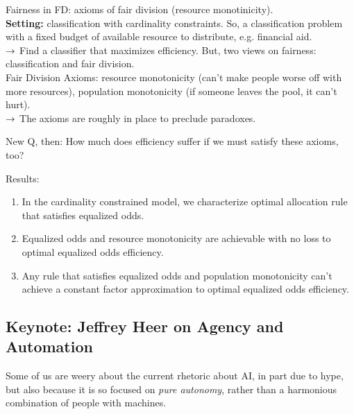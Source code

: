 Fairness in FD: axioms of fair division (resource monotinicity). \\

{\bf Setting:} classification with cardinality constraints. So, a classification problem with a fixed budget of available resource to distribute, e.g. financial aid. \\

$\rightarrow$ Find a classifier that maximizes efficiency. But, two views on fairness: classification and fair division.\\

Fair Division Axioms: resource monotonicity (can't make people worse off with more resources), population monotonicity (if someone leaves the pool, it can't hurt).\\ 

$\rightarrow$ The axioms are roughly in place to preclude paradoxes.

New Q, then: How much does efficiency suffer if we must satisfy these axioms, too? \\


Results:
\begin{enumerate}
    \item In the cardinality constrained model, we characterize optimal allocation rule that satisfies equalized odds.
    \item Equalized odds and resource monotonicity are achievable with no loss to optimal equalized odds efficiency.
    \item Any rule that satisfies equalized odds and population monotonicity can't achieve a constant factor approximation to optimal equalized odds efficiency.
\end{enumerate}

\spacerule


\subsection{Keynote: Jeffrey Heer on Agency and Automation}

Some of us are weery about the current rhetoric about AI, in part due to hype, but also because it is so focused on {\it pure autonomy}, rather than a harmonious combination of people with machines. \\


